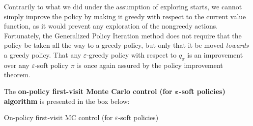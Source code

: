 Contrarily to what we did under the assumption of exploring starts, we cannot simply improve the policy by making it greedy with respect to the current value function, as it would prevent any exploration of the nongreedy actions. Fortunately, the Generalized Policy Iteration method does not require that the policy be taken all the way to a greedy policy, but only that it be moved \textit{towards} a greedy policy. That any $\varepsilon$-greedy policy with respect to $q_\pi$ is an improvement over any $\varepsilon$-soft policy $\pi$ is once again assured by the policy improvement theorem.

The \textbf{on-policy first-visit Monte Carlo control (for $\boldsymbol{\varepsilon}$-soft policies) algorithm} is presented in the box below:

\begin{algorithm}[H]
\DontPrintSemicolon
\SetAlgoVlined
{}

 \caption{On-policy first-visit MC control (for $\varepsilon$-soft policies)}
\end{algorithm}